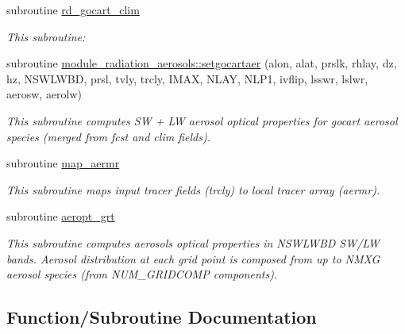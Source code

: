 \begin{DoxyCompactItemize}
subroutine \hyperlink{group__module__radiation__aerosols_ga15bad8499ffd17d967e5788cd6721c4d}{rd\+\_\+gocart\+\_\+clim}
\begin{DoxyCompactList}\small\item\em This subroutine\+: \end{DoxyCompactList}\item 
subroutine \hyperlink{group__module__radiation__aerosols_ga04ce3c11b81d0a0b025f79c4f29acfb8}{module\+\_\+radiation\+\_\+aerosols\+::setgocartaer} (alon, alat, prslk, rhlay, dz, hz, N\+S\+W\+L\+W\+BD, prsl, tvly, trcly, I\+M\+AX, N\+L\+AY, N\+L\+P1, ivflip, lsswr, lslwr, aerosw, aerolw)
\begin{DoxyCompactList}\small\item\em This subroutine computes SW + LW aerosol optical properties for gocart aerosol species (merged from fcst and clim fields). \end{DoxyCompactList}\item 
\mbox{\label{group__module__radiation__aerosols_ga651c4be2fa354238990c5c7b9488e9fd}} 
subroutine \hyperlink{group__module__radiation__aerosols_ga651c4be2fa354238990c5c7b9488e9fd}{map\+\_\+aermr}
\begin{DoxyCompactList}\small\item\em This subroutine maps input tracer fields (trcly) to local tracer array (aermr). \end{DoxyCompactList}\item 
\mbox{\label{group__module__radiation__aerosols_ga4ff866c545425e7029a11999e97d8faa}} 
subroutine \hyperlink{group__module__radiation__aerosols_ga4ff866c545425e7029a11999e97d8faa}{aeropt\+\_\+grt}
\begin{DoxyCompactList}\small\item\em This subroutine computes aerosols optical properties in N\+S\+W\+L\+W\+BD S\+W/\+LW bands. Aerosol distribution at each grid point is composed from up to N\+M\+XG aerosol species (from N\+U\+M\+\_\+\+G\+R\+I\+D\+C\+O\+MP components). \end{DoxyCompactList}\end{DoxyCompactItemize}


\subsection{Function/\+Subroutine Documentation}
\mbox{\label{group__module__radiation__aerosols_ga58ac70a5189ef62c63cf2c87465a030a}} 
